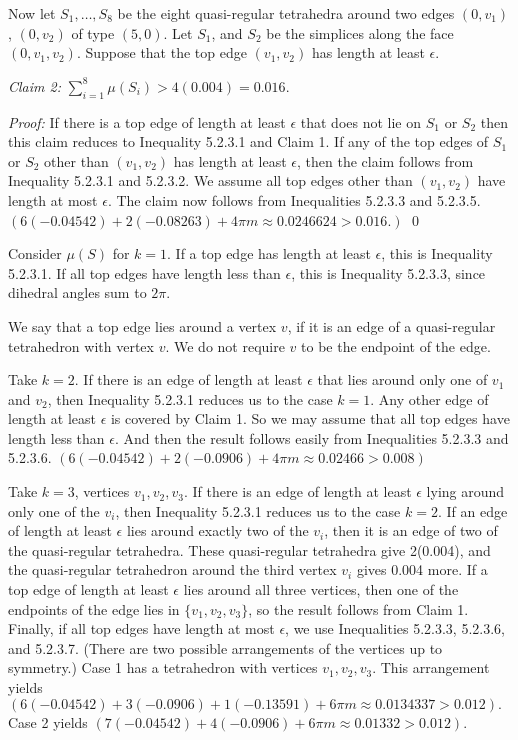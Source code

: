Now let $S_1,\dots,S_8$ be the eight quasi-regular tetrahedra around two 
edges 
$(0,v_1)$, $(0,v_2)$ of type $(5,0)$.  Let $S_1$, and $S_2$ be the simplices along the face $(0,v_1,v_2)$.  Suppose that the top edge $(v_1,v_2)$ has length at least $\epsilon$.  

{\it Claim 2:}  $\sum_{i=1}^8 \mu(S_i) > 4(0.004)=0.016.$ 

{\it Proof:}  If there is a top edge of length at least $\epsilon$ that does not lie on $S_1$ or $S_2$ then this claim reduces to Inequality 5.2.3.1 and Claim 1.  If any of the top edges of $S_1$ or $S_2$ other than $(v_1,v_2)$ has length at least $\epsilon$, then the claim follows from Inequality 5.2.3.1 and 5.2.3.2.  We assume all top edges other than $(v_1,v_2)$ have length at most $\epsilon$.  The claim now follows from Inequalities 5.2.3.3 and 5.2.3.5.  
 $(6(-0.04542) + 2 (-0.08263) + 4 \pi m \approx 0.0246624 > 0.016.)$ 
 \qed

Consider $\mu(S)$ for $k=1$.  If a top edge has length at least $\epsilon$, this is Inequality 5.2.3.1.  If all top edges have length less than $\epsilon$, this is Inequality 5.2.3.3, since dihedral angles sum to $2 \pi$.  

We say that a top edge lies around a vertex $v$, if it is an edge of a quasi-regular tetrahedron with vertex $v$.  We do not require $v$ to be the endpoint of the edge.

Take $k=2$.  If there is an edge of length at least $\epsilon$ that lies around only one of $v_1$ and $v_2$, then Inequality 5.2.3.1 reduces us to the case $k=1$.  Any other edge of length at least $\epsilon$ is covered by Claim 1.  So we may  assume that all top edges have length less than $\epsilon$.  And then the result follows easily from Inequalities 5.2.3.3 and 5.2.3.6. 
$( 6 (-0.04542)+2(-0.0906) +4 \pi m \approx 0.02466 > 0.008 )$

Take $k=3$, vertices $v_1,v_2,v_3$.  If there is an edge of length at least $\epsilon$ lying around only one of the $v_i$, then Inequality 5.2.3.1 reduces us to the case $k=2$.  If an edge of length at least $\epsilon$ lies around exactly two of the $v_i$, then it is an edge of two of the quasi-regular tetrahedra.  These quasi-regular tetrahedra give 2(0.004), and the quasi-regular tetrahedron around the third vertex $v_i$ gives 0.004 more.  If a top edge of length at least $\epsilon$ lies around all three vertices, then one of the endpoints of the edge lies in $\{v_1,v_2,v_3\}$, so the result follows from Claim 1.  Finally, if all top edges have length at most $\epsilon$, we use Inequalities 5.2.3.3, 5.2.3.6, and 5.2.3.7.  (There are two possible arrangements of the vertices up to symmetry.)  Case 1 has a tetrahedron with vertices $v_1,v_2,v_3$.  This arrangement yields 
$(6(-0.04542)+3(-0.0906)+1(-0.13591)+6 \pi m \approx 0.0134337 > 0.012).$  
Case 2 yields 
$(7(-0.04542)+4(-0.0906)+6 \pi m \approx 0.01332 > 0.012)$.

